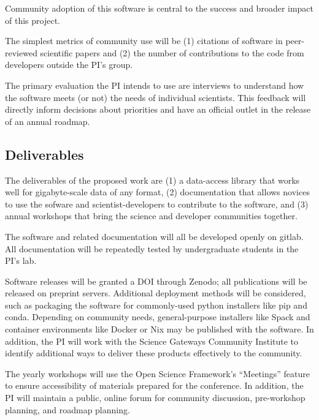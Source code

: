 Community adoption of this software is central to the success and broader impact of this project.

The simplest metrics of community use will be (1) citations of software in peer-reviewed scientific papers and (2) the number of contributions to the code from developers outside the PI's group.

The primary evaluation the PI intends to use are interviews to understand how the software meets (or not) the needs of individual scientists.  This feedback will directly inform decisions about priorities and have an official outlet in the release of an annual roadmap.  


\subsection{Deliverables}
The deliverables of the proposed work are (1) a data-access library that works well for gigabyte-scale data of any format, (2) documentation that allows novices to use the sofware and scientist-developers to contribute to the software, and (3) annual workshops that bring the science and developer communities together.

The software and related documentation will all be developed openly on gitlab.  All documentation will be repeatedly tested by undergraduate students in the PI's lab.

Software releases will be granted a DOI through Zenodo; all publications will be released on preprint servers.  Additional deployment methods will be considered, such as packaging the software for commonly-used python installers like pip and conda.  Depending on community needs, general-purpose installers like Spack \cite{spack} and container environments like Docker \cite{ssi-docker, docker} or Nix \cite{nix-hpc, nix} may be published with the software.  In addition, the PI will work with the Science Gateways Community Institute to identify additional ways to deliver these products effectively to the community.

The yearly workshops will use the Open Science Framework's ``Meetings'' feature to ensure accessibility of materials prepared for the conference.  In addition, the PI will maintain a public, online forum for community discussion, pre-workshop planning, and roadmap planning.



